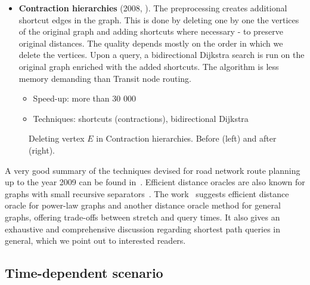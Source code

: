 \begin{itemize}
		\item \textbf{Contraction hierarchies} (2008, \cite{contracthier08}). The preprocessing creates additional shortcut edges in the graph. This is done by deleting one by one the vertices of the original graph and adding shortcuts where necessary - to preserve original distances. The quality depends mostly on the order in which we delete the vertices. Upon a query, a bidirectional Dijkstra search is run on the original graph enriched with the added shortcuts. The algorithm is less memory demanding than Transit node routing.
		\begin{itemize}
			\item Speed-up: more than 30 000
			\item Techniques: shortcuts (contractions), bidirectional Dijkstra
		\end{itemize}
	\end{itemize}
	\hspace{\fill}
	
	\begin{figure}[h!]
		\centering
	    \caption{\label{fig:contraction} Deleting vertex $E$ in Contraction hierarchies. Before (left) and after (right).}
		\end{figure}
	
	\noindent A very good summary of the techniques devised for road network route planning up to the year 2009 can be found in~\cite{engineeringroute09}. Efficient distance oracles are also known for graphs with small recursive separators~\cite{distlabel04}. The work~\cite{sommerthesis10} suggests efficient distance oracle for power-law graphs and another distance oracle method for general graphs, offering trade-offs between stretch and query times. It also gives an exhaustive and comprehensive discussion regarding shortest path queries in general, which we point out to interested readers.
	
\subsection{Time-dependent scenario}
	
